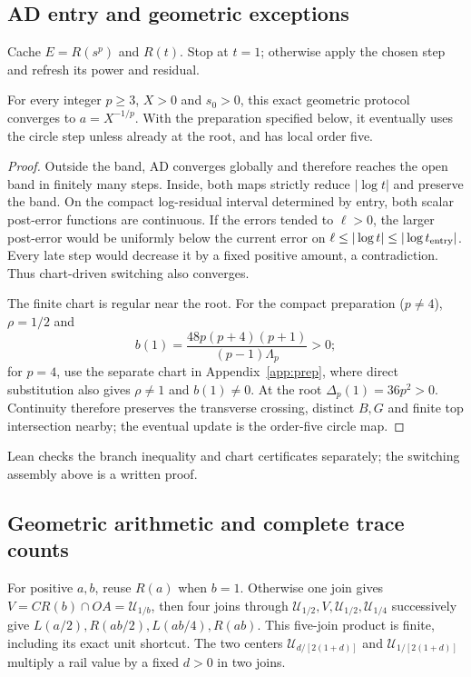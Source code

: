 \documentclass[11pt,a4paper]{article}
\newcommand{\hub}[1]{\mathcal U_{#1}}
\begin{document}
\subsection{AD entry and geometric exceptions}
Cache $E=R(s^p)$ and $R(t)$. Stop at $t=1$; otherwise apply the chosen step and refresh its power and residual.

\begin{proposition}\label{thm:entry}
For every integer $p\ge3$, $X>0$ and $s_0>0$, this exact geometric protocol converges to $a=X^{-1/p}$. With the preparation specified below, it eventually uses the circle step unless already at the root, and has local order five.
\end{proposition}
\begin{proof}
Outside the band, AD converges globally and therefore reaches the open band in finitely many steps. Inside, both maps strictly reduce $|\log t|$ and preserve the band. On the compact log-residual interval determined by entry, both scalar post-error functions are continuous. If the errors tended to $\ell>0$, the larger post-error would be uniformly below the current error on $\ell\le|\log t|\le|\log t_{\rm entry}|$. Every late step would decrease it by a fixed positive amount, a contradiction. Thus chart-driven switching also converges.

The finite chart is regular near the root. For the compact preparation ($p\ne4$), $\rho=1/2$ and
\[
 b(1)=\frac{48p(p+4)(p+1)}{(p-1)\Lambda_p}>0;
\]
for $p=4$, use the separate chart in Appendix~\ref{app:prep}, where direct substitution also gives $\rho\ne1$ and $b(1)\ne0$. At the root $\Delta_p(1)=36p^2>0$. Continuity therefore preserves the transverse crossing, distinct $B,G$ and finite top intersection nearby; the eventual update is the order-five circle map.
\end{proof}
Lean checks the branch inequality and chart certificates separately; the switching assembly above is a written proof.

\subsection{Geometric arithmetic and complete trace counts}
For positive $a,b$, reuse $R(a)$ when $b=1$. Otherwise one join gives $V=CR(b)\cap OA=\hub{1/b}$, then four joins through $\hub{1/2},V,\hub{1/2},\hub{1/4}$ successively give $L(a/2),R(ab/2),L(ab/4),R(ab)$. This five-join product is finite, including its exact unit shortcut. The two centers $\hub{d/[2(1+d)]}$ and $\hub{1/[2(1+d)]}$ multiply a rail value by a fixed $d>0$ in two joins.
\end{document}
